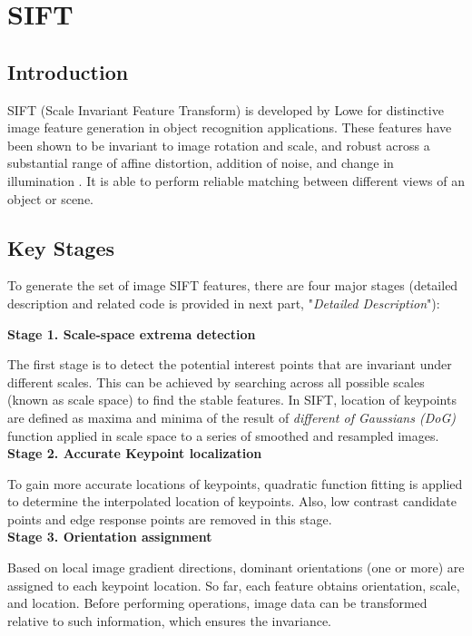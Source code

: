 \documentclass[paper=a4, fontsize=11pt]{scrartcl} %
\numberwithin{equation}{section} %
\numberwithin{figure}{section} %
\numberwithin{table}{section} %
\begin{document}
\section{SIFT}

\subsection{Introduction}

SIFT (Scale Invariant Feature Transform) is developed by Lowe \cite{sift} \cite{sift-99} for distinctive image feature generation in object recognition applications. These features have been shown to be invariant to image rotation and scale, and robust across a substantial range of affine distortion, addition of noise, and change in illumination \cite{Se01vision-basedmobile}. It is able to perform reliable matching between different views of an object or scene.


\subsection{Key Stages}

To generate the set of image SIFT features, there are four major stages (detailed description and related code is provided in next part, "\textsl{Detailed Description}"):

\textbf{Stage 1. Scale-space extrema detection}

The first stage is to detect the potential interest points that are invariant under different scales. This can be achieved by searching across all possible scales (known as scale space) to find the stable features. In SIFT, location of keypoints are defined as maxima and minima of the result of \textsl{different of Gaussians (DoG)} function applied in scale space to a series of smoothed and resampled images.\\

\textbf{Stage 2. Accurate Keypoint localization}

To gain more accurate locations of keypoints, quadratic function fitting is applied to determine the interpolated location of keypoints. Also, low contrast candidate points and edge response points are removed in this stage.\\

\textbf{Stage 3. Orientation assignment}

Based on local image gradient directions, dominant orientations (one or more) are assigned to each keypoint location. So far, each feature obtains orientation, scale, and location. Before performing operations, image data can be transformed relative to such information, which ensures the invariance.\\
\end{document}

